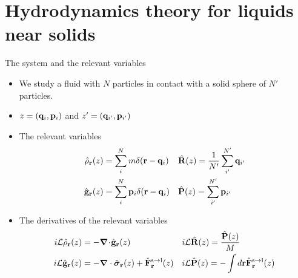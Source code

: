 \documentclass{beamer}
\newcommand{\esc}{\!\cdot\!}
\begin{document}
\section{Hydrodynamics theory for liquids near solids}
\begin{frame}{The system and the relevant variables}
  \begin{itemize}
    \item We study a fluid with $N$ particles in contact with a solid sphere of $N'$ particles.
    \item $z= ({\bf q}_i, {\bf p}_i)$ and $z'= ({\bf q}_{i'}, {\bf p}_{i'})$
    \item The relevant variables 
      \begin{align}
        \hat{\rho}_{\bf r}(z) &=\sum^{N}_im\delta({\bf r}-{\bf q}_i)
      &&\hat{\bf R}(z)=\frac{1}{N'}\sum_{i'}^{N'}{\bf q}_{i'}
      \nonumber\\
        \hat{\bf g}_{\bf r}(z) &=\sum^{N}_i{\bf p}_i\delta({\bf r}-{\bf q}_i)
      &&\hat{\bf P}(z)=\sum_{i'}^{N'}{\bf p}_{i'}
      \nonumber
      \end{align}
    \item The derivatives of the relevant variables
      \begin{align}
        i{\cal L} \hat{\rho}_{\bf r}(z) &= -\boldsymbol{\nabla}\esc\hat{\bf g}_{\bf r}(z)
        && i{\cal L}\hat{\bf R}(z) =\frac{\hat{\bf P}(z)}{M}
      \nonumber\\
      i{\cal L}\hat{\bf g}_{\bf r}(z)
          &=-\boldsymbol{\nabla}\cdot \hat{\boldsymbol{\sigma}}_{\bf r}(z)+\hat{{\bf F}}^{\rm s\to l}_{\bf r}(z) 
        &&i{\cal L}\hat{\bf P}(z) =-\int  d{\bf r} \hat{\bf F}^{\rm s\to l}_{\bf r}(z)
         \nonumber
\end{align}
    \end{itemize}
\end{frame}
\end{document}
